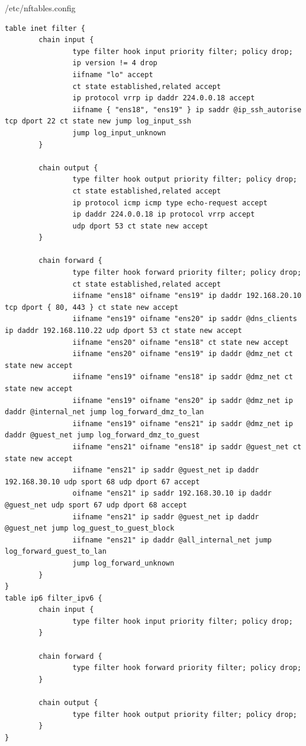 \documentclass{article}
\begin{document}
\begin{configbox}{/etc/nftables.config}
\begin{lstlisting}
table inet filter {
        chain input {
                type filter hook input priority filter; policy drop;
                ip version != 4 drop
                iifname "lo" accept
                ct state established,related accept
                ip protocol vrrp ip daddr 224.0.0.18 accept
                iifname { "ens18", "ens19" } ip saddr @ip_ssh_autorise tcp dport 22 ct state new jump log_input_ssh
                jump log_input_unknown
        }

        chain output {
                type filter hook output priority filter; policy drop;
                ct state established,related accept
                ip protocol icmp icmp type echo-request accept
                ip daddr 224.0.0.18 ip protocol vrrp accept
                udp dport 53 ct state new accept
        }

        chain forward {
                type filter hook forward priority filter; policy drop;
                ct state established,related accept
                iifname "ens18" oifname "ens19" ip daddr 192.168.20.10 tcp dport { 80, 443 } ct state new accept
                iifname "ens19" oifname "ens20" ip saddr @dns_clients ip daddr 192.168.110.22 udp dport 53 ct state new accept
                iifname "ens20" oifname "ens18" ct state new accept
                iifname "ens20" oifname "ens19" ip daddr @dmz_net ct state new accept
                iifname "ens19" oifname "ens18" ip saddr @dmz_net ct state new accept
                iifname "ens19" oifname "ens20" ip saddr @dmz_net ip daddr @internal_net jump log_forward_dmz_to_lan
                iifname "ens19" oifname "ens21" ip saddr @dmz_net ip daddr @guest_net jump log_forward_dmz_to_guest
                iifname "ens21" oifname "ens18" ip saddr @guest_net ct state new accept
                iifname "ens21" ip saddr @guest_net ip daddr 192.168.30.10 udp sport 68 udp dport 67 accept
                oifname "ens21" ip saddr 192.168.30.10 ip daddr @guest_net udp sport 67 udp dport 68 accept
                iifname "ens21" ip saddr @guest_net ip daddr @guest_net jump log_guest_to_guest_block
                iifname "ens21" ip daddr @all_internal_net jump log_forward_guest_to_lan
                jump log_forward_unknown
        }
}
table ip6 filter_ipv6 {
        chain input {
                type filter hook input priority filter; policy drop;
        }

        chain forward {
                type filter hook forward priority filter; policy drop;
        }

        chain output {
                type filter hook output priority filter; policy drop;
        }
}

\end{lstlisting}
\end{configbox}
\end{document}
